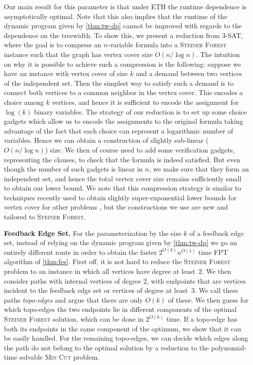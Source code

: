 \documentclass[a4paper]{article}
\theoremstyle{plain}
\newcommand{\pname}[1]{\textsc{#1}}
\newcommand{\SF}{\pname{Steiner Forest}\xspace}
\begin{document}
Our main result for this parameter is that under ETH the runtime dependence
is asymptotically optimal. Note that this also implies that the runtime of the dynamic program
given by \autoref{thm:tw-dp} cannot be improved with regards to the dependence
on the treewidth. To show this, we present a reduction from \textsc{3-SAT}, where the
goal is to compress an $n$-variable formula into a \SF
instance such that the graph has vertex cover size $O(n/\log n)$. The intuition on why
it is possible to achieve such a compression is the following: suppose we have
an instance with vertex cover of size $k$ and a demand between two vertices of
the independent set. Then the simplest way to satisfy such a demand is to
connect both vertices to a common neighbor in the vertex cover. This encodes a
choice among $k$ vertices, and hence it is sufficient to encode the assignment for
$\log(k)$ binary variables. The strategy of our reduction is to set up some
choice gadgets which allow us to encode the assignments to the original formula
taking advantage of the fact that each choice can represent a logarithmic
number of variables. Hence we can obtain a construction of slightly sub-linear
($O(n/\log n)$) size.  We then of course need to add some verification gadgets,
representing the clauses, to check that the formula is indeed satisfied. But
even though the number of such gadgets is linear in $n$, we make sure that they
form an independent set, and hence the total vertex cover size remains
sufficiently small to obtain our lower bound. We note that this compression
strategy is similar to techniques recently used to obtain slightly
super-exponential lower bounds for vertex cover for other problems
\cite{LampisMV23,LampisV23}, but the constructions we use are new and tailored to
\SF.

\smallskip
\textbf{Feedback Edge Set.} For the parameterization by the size $k$ of a
feedback edge set, instead of relying on the dynamic program given by
\autoref{thm:tw-dp} we go an entirely different route in order to obtain the
faster $2^{O(k)}n^{O(1)}$ time FPT algorithm of \autoref{thm:fes}. First off,
it is not hard to reduce the \SF problem to an instance in which all vertices
have degree at least~$2$.  We then consider paths with internal vertices of
degree $2$, with endpoints that are vertices incident to the feedback edge set
or vertices of degree at least~$3$.  We call these paths \emph{topo-edges} and
argue that there are only $O(k)$ of these. We then guess for which topo-edges
the two endpoints lie in different components of the optimal \SF solution,
which can be done in $2^{O(k)}$ time.  If a topo-edge has both its endpoints in
the same component of the optimum, we show that it can be easily handled. For
the remaining topo-edges, we can decide which edges along the path do not
belong to the optimal solution by a reduction to the polynomial-time solvable
\pname{Min Cut} problem.
\end{document}
